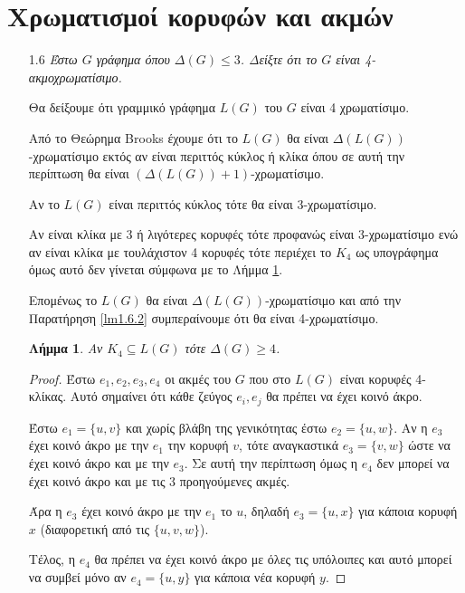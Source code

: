 \documentclass[a4paper, oneside, 11pt]{article}
\newtheorem{lm}[thm]{Λήμμα}
\theoremstyle{definition}
\begin{document}


\section{Χρωματισμοί κορυφών και ακμών}
\begin{enumerate}
   \item[1.6] \emph{Έστω $G$ γράφημα όπου $\Delta(G) \leq 3$. Δείξτε ότι το
              $G$ είναι 4-ακμοχρωματίσιμο.}

   Θα δείξουμε ότι γραμμικό γράφημα $L(G)$ του $G$ είναι 4 χρωματίσιμο.

   Από το Θεώρημα Brooks έχουμε ότι το $L(G)$ θα είναι
   $\Delta(L(G))$-χρωματίσιμο εκτός αν είναι περιττός κύκλος
   ή κλίκα όπου σε αυτή την περίπτωση θα είναι $(\Delta(L(G)) + 1)$-χρωματίσιμο.

   Αν το $L(G)$ είναι περιττός κύκλος τότε θα είναι 3-χρωματίσιμο.

   Αν είναι κλίκα με 3 ή λιγότερες κορυφές τότε προφανώς είναι
   3-χρωματίσιμο ενώ αν είναι κλίκα με τουλάχιστον 4 κορυφές τότε
   περιέχει το $K_4$ ως υπογράφημα όμως αυτό δεν γίνεται
   σύμφωνα με το Λήμμα \ref{lm1.6.1}.

   Επομένως το $L(G)$ θα είναι $\Delta(L(G))$-χρωματίσιμο και από
   την Παρατήρηση \ref{lm1.6.2} συμπεραίνουμε ότι θα είναι
   4-χρωματίσιμο.
   
   \begin{lm}
      \label{lm1.6.1}
      Αν $K_4 \subseteq L(G)$ τότε $\Delta(G) \geq 4$.
   \end{lm}
   \begin{proof}
      Έστω $e_1, e_2, e_3, e_4$ οι ακμές του $G$ που στο $L(G)$ είναι
      κορυφές 4-κλίκας. Αυτό σημαίνει ότι κάθε ζεύγος $e_i, e_j$ θα πρέπει
      να έχει κοινό άκρο.

      Έστω $e_1 = \{u, v\}$ και χωρίς βλάβη της γενικότητας έστω
      $e_2 = \{u, w\}$. Αν η $e_3$ έχει κοινό άκρο με την $e_1$
      την κορυφή $v$, τότε αναγκαστικά $e_3 = \{v, w\}$ ώστε να έχει
      κοινό άκρο και με την $e_3$. Σε αυτή την περίπτωση όμως η $e_4$
      δεν μπορεί να έχει κοινό άκρο και με τις 3 προηγούμενες ακμές.

      Άρα η $e_3$ έχει κοινό άκρο με την $e_1$ το $u$, δηλαδή
      $e_3 = \{ u, x \}$ για κάποια κορυφή $x$ (διαφορετική από
      τις $\{u, v, w\}$).

      Τέλος, η $e_4$ θα πρέπει να έχει κοινό άκρο με όλες τις υπόλοιπες
      και αυτό μπορεί να συμβεί μόνο αν $e_4 = \{u, y\}$ για κάποια
      νέα κορυφή $y$.


\end{proof}
\end{enumerate}
\end{document}
